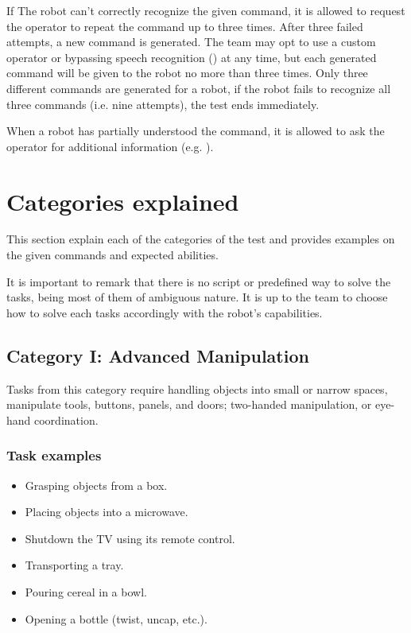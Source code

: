 If The robot can't correctly recognize the given command, it is allowed to request the operator to repeat the command up to three times. After three failed attempts, a new command is generated. The team may opt to use a custom operator or bypassing speech recognition () at any time, but each generated command will be given to the robot no more than three times. Only three different commands are generated for a robot, if the robot fails to recognize all three commands (i.e. nine attempts), the test ends immediately.

When a robot has partially understood the command, it is allowed to ask the operator for additional information (e.g. \textit{}).

%
%
\section{Categories explained}
\label{sec:eegpsr-categories-explained}
This section explain each of the categories of the test and provides examples on the given commands and expected abilities.

It is important to remark that there is no script or predefined way to solve the tasks, being most of them of ambiguous nature. It is up to the team to choose how to solve each tasks accordingly with the robot's capabilities.


%
%
\subsection{Category I: Advanced Manipulation}
\label{sec:eegpsr-category1-explained}
Tasks from this category require handling objects into small or narrow spaces, manipulate tools, buttons, panels, and doors; two-handed manipulation, or eye-hand coordination. 

\subsubsection{Task examples}
\begin{itemize}
	\item Grasping objects from a box.
	\item Placing objects into a microwave.
	\item Shutdown the TV using its remote control.
	\item Transporting a tray.
	\item Pouring cereal in a bowl.
	\item Opening a bottle (twist, uncap, etc.).
\end{itemize}


